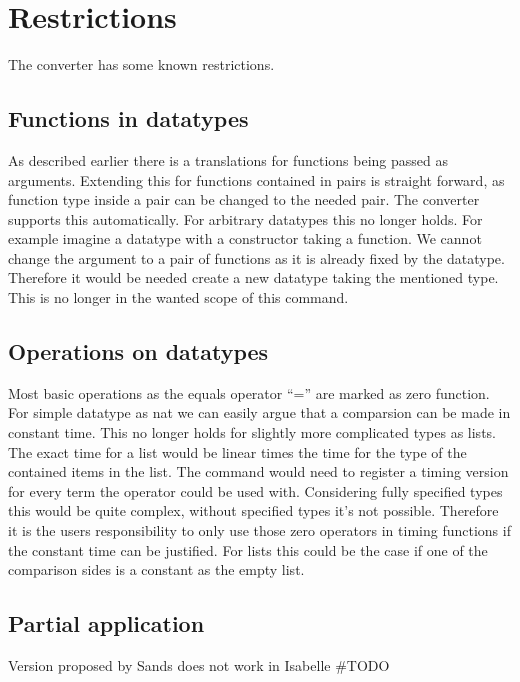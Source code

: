
\section{Restrictions} \label{chapter:restrictions}
The converter has some known restrictions.

\subsection{Functions in datatypes}
As described earlier there is a translations for functions being passed as arguments.
Extending this for functions contained in pairs is straight forward, as function type inside a pair can be changed to the needed pair.
The converter supports this automatically.
For arbitrary datatypes this no longer holds.
For example imagine a datatype with a constructor taking a function.
We cannot change the argument to a pair of functions as it is already fixed by the datatype.
Therefore it would be needed create a new datatype taking the mentioned type.
This is no longer in the wanted scope of this command.

\subsection{Operations on datatypes} \label{chapter:nonconstant_zeros}
Most basic operations as the equals operator ``='' are marked as zero function.
For simple datatype as nat we can easily argue that a comparsion can be made in constant time.
This no longer holds for slightly more complicated types as lists.
The exact time for a list would be linear times the time for the type of the contained items in the list.
The command would need to register a timing version for every term the operator could be used with.
Considering fully specified types this would be quite complex, without specified types it's not possible.
Therefore it is the users responsibility to only use those zero operators in timing functions if the constant time can be justified.
For lists this could be the case if one of the comparison sides is a constant as the empty list.

\subsection{Partial application}

Version proposed by Sands does not work in Isabelle \#TODO
